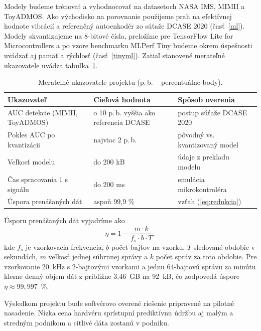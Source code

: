 \documentclass[10pt,twoside,slovak,a4paper]{article}
\begin{document}

Modely budeme trénovať a vyhodnocovať na datasetoch NASA IMS, MIMII a ToyADMOS. Ako východisko na porovnanie použijeme prah na efektívnej hodnote vibrácií a referenčný autoenkodér zo súťaže DCASE 2020 (časť~\ref{ml}). Modely skvantizujeme na 8-bitové čísla, preložíme pre TensorFlow Lite for Microcontrollers a po vzore benchmarku MLPerf Tiny budeme okrem úspešnosti uvádzať aj pamäť a rýchlosť (časť~\ref{tinyml}). Zatiaľ stanovené merateľné ukazovatele uvádza tabuľka~\ref{tab:ukazovatele}.

\begin{table}[tbh]
\centering
\caption{Merateľné ukazovatele projektu (p.\,b. -- percentuálne body).}
\label{tab:ukazovatele}
\small
\begin{tabularx}{\textwidth}{@{}X X X@{}}
\toprule
\textbf{Ukazovateľ} & \textbf{Cieľová hodnota} & \textbf{Spôsob overenia} \\
\midrule
AUC detekcie (MIMII, ToyADMOS) & o 10 p.\,b. vyššia ako referencia DCASE & postup súťaže DCASE 2020 \\
Pokles AUC po kvantizácii & najviac 2 p.\,b. & pôvodný vs. kvantizovaný model \\
Veľkosť modelu & do 200 kB & údaje z prekladu modelu \\
Čas spracovania 1 s signálu & do 200 ms & emulácia mikrokontroléra \\
Úspora prenášaných dát & aspoň 99,9 \% & vzťah (\ref{eq:redukcia}) \\
\bottomrule
\end{tabularx}
\end{table}

Úsporu prenášaných dát vyjadríme ako
\begin{equation}
\eta = 1 - \frac{m \cdot k}{f_s \cdot b \cdot T},
\label{eq:redukcia}
\end{equation}
kde $f_s$ je vzorkovacia frekvencia, $b$ počet bajtov na vzorku, $T$ sledované obdobie v sekundách, $m$ veľkosť jednej súhrnnej správy a $k$ počet správ za toto obdobie. Pre vzorkovanie 20~kHz s 2-bajtovými vzorkami a jednu 64-bajtovú správu za minútu klesne denný objem dát z približne 3,46~GB na 92~kB, čo zodpovedá úspore $\eta \approx 99{,}997$~\%.

Výsledkom projektu bude softvérovo overené riešenie pripravené na pilotné nasadenie. Nízka cena hardvéru sprístupní prediktívnu údržbu aj malým a stredným podnikom a citlivé dáta zostanú v podniku.
\end{document}
